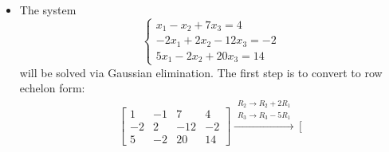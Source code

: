 \documentclass{article}
\begin{document}
\begin{itemize}
\[\begin{array}{c}
x_1 = -14/3 - 2x_3 - (5/3)x_4 \\
x_2 = -3 - 2x_3 
\end{array}\right.\]
\(x_3\) and \(x_4\) are free variables and can be set to the arbitrary values \(s\) and \(t\) respectively. Therefore:
\[\begin{bmatrix} x_1 \\ x_2 \\ x_3 \\ x_4 \end{bmatrix} 
= \begin{bmatrix} -14/3 - 2s - (5/3)t \\ -3 - 2s \\ s \\ t \end{bmatrix}
= \begin{bmatrix} -14/3 \\ -3 \\ 0 \\ 0 \end{bmatrix} + s\begin{bmatrix} -2 \\ -2 \\ 1 \\ 0 \end{bmatrix} + t\begin{bmatrix} -5/3 \\ 0 \\ 0 \\ 1 \end{bmatrix}\]
\item 
The system
\[\left\{\begin{array}{c}
x_1 - x_2 + 7x_3 = 4 \\
-2x_1 + 2x_2 - 12x_3 = -2 \\
5x_1 - 2x_2 + 20x_3 = 14
\end{array}\right.\]
will be solved via Gaussian elimination. The first step is to convert to row echelon form:  
\begin{align*}
& \left[\begin{array}{ccc|c}
1 & -1 & 7 & 4 \\
-2 & 2 & -12 & -2 \\
5 & -2 & 20 & 14
\end{array}\right] 
\xrightarrow{\begin{array}{c} R_2 \rightarrow R_2 + 2R_1 \\ R_3 \rightarrow R_3 - 5R_1 \end{array}}  
\left[\begin{array}{ccc|c}

\end{array}
\end{align*}
\end{itemize}
\end{document}
